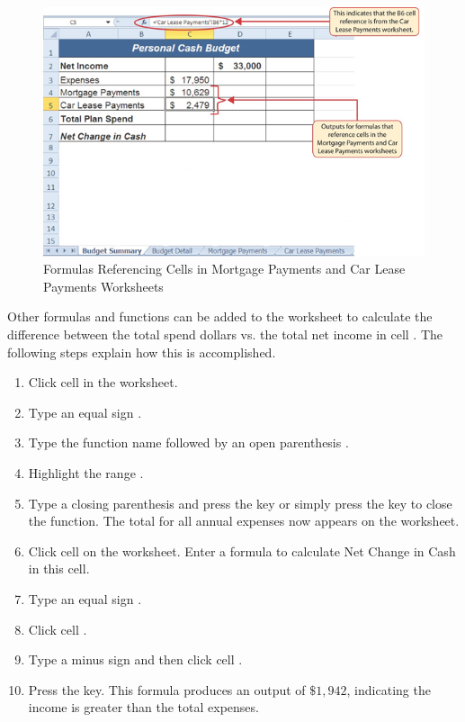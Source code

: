 \begin{figure}[H]
	\centering
	\includegraphics[width=\maxwidth{.95\linewidth}]{gfx/ch02_fig37}
	\caption{Formulas Referencing Cells in Mortgage Payments and Car Lease Payments Worksheets}
	\label{02:fig37}
\end{figure}

Other formulas and functions can be added to the  worksheet to calculate the difference between the total spend dollars vs. the total net income in cell . The following steps explain how this is accomplished.

\begin{enumerate}
	\item Click cell  in the  worksheet.
	\item Type an equal sign \fmtTyping{=}.
	\item Type the function name  followed by an open parenthesis \fmtTyping{(}.
	\item Highlight the range .
	\item Type a closing parenthesis \fmtTyping{)} and press the  key or simply press the  key to close the function. The total for all annual expenses now appears on the worksheet.
	\item Click cell  on the  worksheet. Enter a formula to calculate Net Change in Cash in this cell.
	\item Type an equal sign \fmtTyping{=}.
	\item Click cell .
	\item Type a minus sign \fmtTyping{-} and then click cell .
	\item Press the  key. This formula produces an output of $ \$1,942 $, indicating the income is greater than the total expenses.
\end{enumerate}


